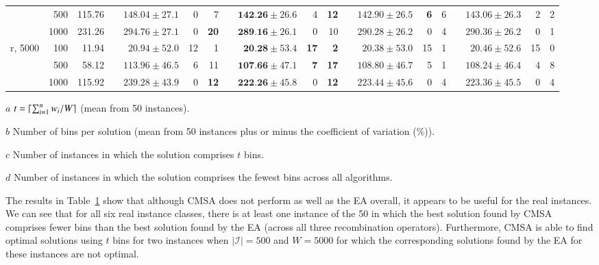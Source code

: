 \documentclass[a4paper,11pt,authoryear]{elsarticle}
\DeclarePairedDelimiter{\ceil}{\lceil}{\rceil}
\begin{document}
\begin{table}[h]
\begin{threeparttable}
{\begin{tabular}{crr c rrr c rrr c rrr c rrr}
	& 500 & 115.76 && $148.04 \pm 27.1$ & 0 & 7 && $\textbf{142.26} \pm 26.6$ & 4 & \textbf{12} && $142.90 \pm 26.5$ & \textbf{6} & 6 && $143.06 \pm 26.3$ & 2 & 2 \\
	& 1000 & 231.26 && $294.76 \pm 27.1$ & 0 & \textbf{20} && $\textbf{289.16} \pm 26.1$ & 0 & 10 && $290.28 \pm 26.2$ & 0 & 4 && $290.36 \pm 26.2$ & 0 & 1 \\
	\midrule
	r, 5000 & 100 & 11.94 && $20.94 \pm 52.0$ & 12 & 1 && $\textbf{20.28} \pm 53.4$ & \textbf{17} & \textbf{2} && $20.38 \pm 53.0$ & 15 & 1 && $20.46 \pm 52.6$ & 15 & 0 \\
	& 500 & 58.12 && $113.96 \pm 46.5$ & 6 & 11 && $\textbf{107.66} \pm 47.1$ & \textbf{7} & \textbf{17} && $108.80 \pm 46.7$ & 5 & 1 && $108.24 \pm 46.4$ & 4 & 8 \\		
	& 1000 & 115.92 && $239.28 \pm 43.9$ & 0 & \textbf{12} && $\textbf{222.26} \pm 45.8$ & 0 & \textbf{12} && $223.44 \pm 45.6$ & 0 & 4 && $223.36 \pm 45.5$ & 0 & 4\\
	\bottomrule
\end{tabular}}	
\vspace{0.2cm} %
\begin{tablenotes}
	\tiny
	\item[$a$] $t = \ceil{\sum_{i=1}^{n} w_i / W}$ (mean from 50 instances).
	\item[$b$] Number of bins per solution (mean from 50 instances plus or minus the coefficient of variation (\%)).
	\item[$c$] Number of instances in which the solution comprises $t$ bins.
	\item[$d$] Number of instances in which the solution comprises the fewest bins across all algorithms.
\end{tablenotes}
\end{threeparttable}
\label{table:cmsa}
\end{table}

The results in Table~\ref{table:cmsa} show that although CMSA does not perform as well as the EA overall, it appears to be useful for the real instances. We can see that for all six real instance classes, there is at least one instance of the 50 in which the best solution found by CMSA comprises fewer bins than the best solution found by the EA (across all three recombination operators). Furthermore, CMSA is able to find optimal solutions using $t$ bins for two instances when $|\mathcal{I}| = 500$ and $W = 5000$ for which the corresponding solutions found by the EA for these instances are not optimal. 
\end{document}
